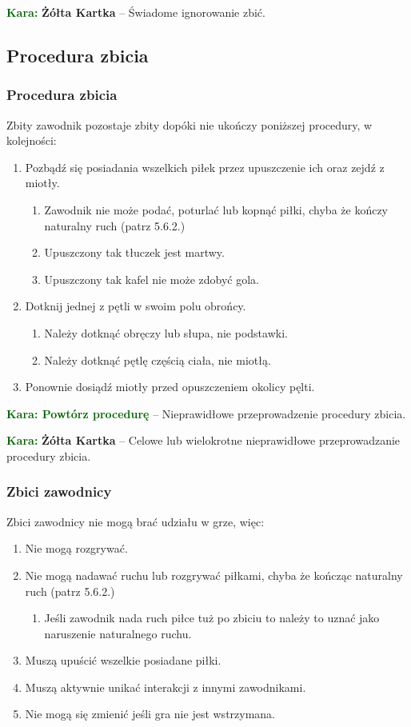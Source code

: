 \documentclass[11pt,a4paper]{article}
\newcommand\yellowcard[1]{\bgroup\textcolor{darkgreen}{\textbf{Kara: }}\bgroup\textcolor{darkyellow}{\textbf{Żółta Kartka}} -- #1}
\newcommand\penaltyd[2]{\bgroup\textcolor{darkgreen}{\textbf{Kara: #1}} -- #2}
\begin{document}
\yellowcard{Świadome ignorowanie zbić.}

\subsection{Procedura zbicia}

\subsubsection{Procedura zbicia}
Zbity zawodnik pozostaje zbity dopóki nie ukończy poniższej procedury, w kolejności:
\begin{enumerate}
  \item Pozbądź się posiadania wszelkich piłek przez upuszczenie ich oraz zejdź z miotły.
  \begin{enumerate}
    \item Zawodnik nie może podać, poturlać lub kopnąć piłki, chyba że kończy naturalny ruch (patrz 5.6.2.) %
    \item Upuszczony tak tłuczek jest martwy.
    \item Upuszczony tak kafel nie może zdobyć gola.
  \end{enumerate}
  \item Dotknij jednej z pętli w swoim polu obrońcy.
  \begin{enumerate}
    \item Należy dotknąć obręczy lub słupa, nie podstawki.
    \item Należy dotknąć pętlę częścią ciała, nie miotłą.
  \end{enumerate}
  \item Ponownie dosiądź miotły przed opuszczeniem okolicy pęlti.
\end{enumerate}

\penaltyd{Powtórz procedurę}{Nieprawidłowe przeprowadzenie procedury zbicia.}

\yellowcard{Celowe lub wielokrotne nieprawidłowe przeprowadzanie procedury zbicia.}

\subsubsection{Zbici zawodnicy}
Zbici zawodnicy nie mogą brać udziału w grze, więc:
\begin{enumerate}
  \item Nie mogą rozgrywać.
  \item Nie mogą nadawać ruchu lub rozgrywać piłkami, chyba że kończąc naturalny ruch (patrz 5.6.2.) %
  \begin{enumerate}
    \item Jeśli zawodnik nada ruch piłce tuż po zbiciu to należy to uznać jako naruszenie naturalnego ruchu.
  \end{enumerate}
  \item Muszą upuścić wszelkie posiadane piłki.
  \item Muszą aktywnie unikać interakcji z innymi zawodnikami.
  \item Nie mogą się zmienić jeśli gra nie jest wstrzymana.
\end{enumerate}
\end{document}
